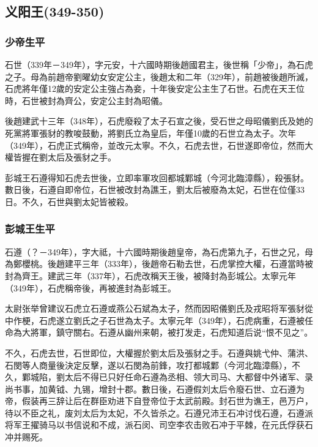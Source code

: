 
\subsection{义阳王\tiny(349-350)}

\subsubsection{少帝生平}

石世（339年－349年），字元安，十六國時期後趙國君主，後世稱「少帝」，為石虎之子。母為前趙帝劉曜幼女安定公主，後趙太和二年（329年），前趙被後趙所滅，石虎將年僅12歲的安定公主強占為妾，十年後安定公主生了石世。石虎在天王位時，石世被封為齊公，安定公主封為昭儀。

後趙建武十三年（348年），石虎廢殺了太子石宣之後，受石世之母昭儀劉氏及她的死黨將軍張豺的教唆鼓動，將劉氏立為皇后，年僅10歲的石世立為太子。次年（349年），石虎正式稱帝，並改元太寧。不久，石虎去世，石世遂即帝位，然而大權皆握在劉太后及張豺之手。

彭城王石遵得知石虎去世後，立即率軍攻回都城鄴城（今河北臨漳縣），殺張豺。數日後，石遵自即帝位，石世被改封為譙王，劉太后被廢為太妃，石世在位僅33日。不久，石世與劉太妃皆被殺。

\subsubsection{彭城王生平}

石遵（？－349年），字大祗，十六國時期後趙皇帝，為石虎第九子，石世之兄，母為鄭櫻桃。後趙建平三年（333年），後趙帝石勒去世，石虎掌控大權，石遵當時被封為齊王。建武三年（337年），石虎改稱天王後，被降封為彭城公。太寧元年（349年），石虎稱帝後，再被進封為彭城王。

太尉张举曾建议石虎立石遵或燕公石斌為太子，然而因昭儀劉氏及戎昭将军張豺從中作梗，石虎遂立劉氏之子石世為太子。太寧元年（349年），石虎病重，石遵被任命為大將軍，鎮守關右。石遵从幽州来朝，被打发走，石虎知道后说“恨不见之”。

不久，石虎去世，石世即位，大權握於劉太后及張豺之手。石遵與姚弋仲、蒲洪、石閔等人商量後決定反擊，遂以石閔為前鋒，攻打都城鄴（今河北臨漳縣），不久，鄴城陷，劉太后不得已只好任命石遵為丞相、领大司马、大都督中外诸军、录尚书事，加黄钺、九锡，增封十郡。數日後，石遵假刘太后令廢石世、立石遵为帝，假装再三辞让后在群臣劝进下自登帝位于太武前殿。封石世为谯王，邑万户，待以不臣之礼，废刘太后为太妃，不久皆杀之。石遵兄沛王石冲讨伐石遵，石遵派将军王擢骑马以书信说和不成，派石闵、司空李农击败石冲于平棘，在元氏俘获石冲并赐死。

